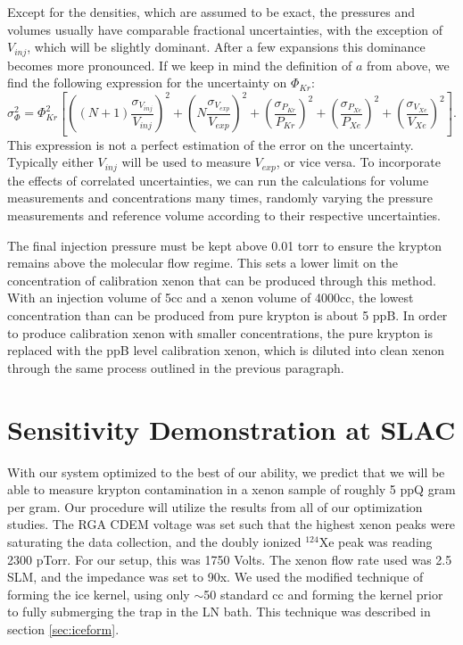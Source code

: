 Except for the densities, which are assumed to be exact, the pressures and volumes usually have comparable fractional uncertainties, with the exception of $V_{inj}$, which will be slightly dominant. After a few expansions this dominance becomes more pronounced. If we keep in mind the definition of $a$ from above, we find the following expression for the uncertainty on $\Phi_{Kr}$:
\begin{equation}
\sigma_{\Phi}^{2} = \Phi_{Kr}^2\left[  \left((N+1)\frac{\sigma_{V_{inj}}}{V_{inj}}\right)^2 + \left(N\frac{\sigma_{V_{exp}}}{V_{exp}}\right)^2  + \left(\frac{\sigma_{P_{Kr}}}{P_{Kr}}\right)^2   + \left(\frac{\sigma_{P_{Xe}}}{P_{Xe}}\right)^2   + \left(\frac{\sigma_{V_{Xe}}}{V_{Xe}}\right)^2  \right].
\end{equation}
This expression is not a perfect estimation of the error on the uncertainty. Typically either $V_{inj}$ will be used to measure $V_{exp}$, or vice versa. To incorporate the effects of correlated uncertainties, we can run the calculations for volume measurements and concentrations many times, randomly varying the pressure measurements and reference volume according to their respective uncertainties.

The final injection pressure must be kept above 0.01 torr to ensure the krypton remains above the molecular flow regime. This sets a lower limit on the concentration of calibration xenon that can be produced through this method. With an injection volume of 5cc and a xenon volume of 4000cc, the lowest concentration than can be produced from pure krypton is about 5 ppB. In order to produce calibration xenon with smaller concentrations, the pure krypton is replaced with the ppB level calibration xenon, which is diluted into clean xenon through the same process outlined in the previous paragraph.



\section{Sensitivity Demonstration at SLAC}\label{sec:demsens}
With our system optimized to the best of our ability, we predict that we will be able to measure krypton contamination in a xenon sample of roughly 5 ppQ gram per gram. Our procedure will utilize the results from all of our optimization studies. The RGA CDEM voltage was set such that the highest xenon peaks were saturating the data collection, and the doubly ionized $^{124}$Xe peak was reading 2300 pTorr. For our setup, this was 1750 Volts. The xenon flow rate used was 2.5 SLM, and the impedance was set to 90x. We used the modified technique of forming the ice kernel, using only $\sim$50 standard cc and forming the kernel prior to fully submerging the trap in the LN bath. This technique was described in section \ref{sec:iceform}. 

